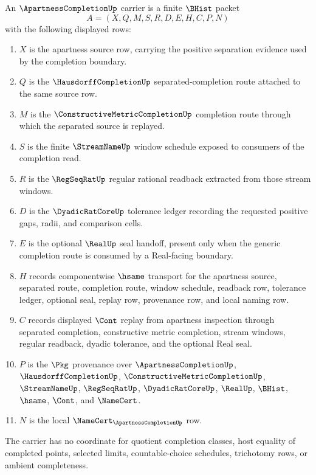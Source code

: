 \begin{definition}
\label{def:apartness-completion-carrier}
An $\ApartnessCompletionUp$ carrier is a finite $\BHist$ packet
$$
A=(X,Q,M,S,R,D,E,H,C,P,N)
$$
with the following displayed rows:
\begin{enumerate}
\item $X$ is the apartness source row, carrying the positive separation evidence used by the completion boundary.
\item $Q$ is the $\HausdorffCompletionUp$ separated-completion route attached to the same source row.
\item $M$ is the $\ConstructiveMetricCompletionUp$ completion route through which the separated source is replayed.
\item $S$ is the finite $\StreamNameUp$ window schedule exposed to consumers of the completion read.
\item $R$ is the $\RegSeqRatUp$ regular rational readback extracted from those stream windows.
\item $D$ is the $\DyadicRatCoreUp$ tolerance ledger recording the requested positive gaps, radii, and comparison cells.
\item $E$ is the optional $\RealUp$ seal handoff, present only when the generic completion route is consumed by a Real-facing boundary.
\item $H$ records componentwise $\hsame$ transport for the apartness source, separated route, completion route, window schedule, readback row, tolerance ledger, optional seal, replay row, provenance row, and local naming row.
\item $C$ records displayed $\Cont$ replay from apartness inspection through separated completion, constructive metric completion, stream windows, regular readback, dyadic tolerance, and the optional Real seal.
\item $P$ is the $\Pkg$ provenance over $\ApartnessCompletionUp$, $\HausdorffCompletionUp$, $\ConstructiveMetricCompletionUp$, $\StreamNameUp$, $\RegSeqRatUp$, $\DyadicRatCoreUp$, $\RealUp$, $\BHist$, $\hsame$, $\Cont$, and $\NameCert$.
\item $N$ is the local $\NameCert_{\ApartnessCompletionUp}$ row.
\end{enumerate}
The carrier has no coordinate for quotient completion classes, host equality of completed points, selected limits, countable-choice schedules, trichotomy rows, or ambient completeness.
\end{definition}

